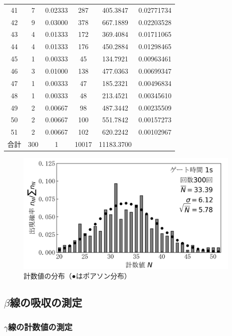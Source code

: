 \documentclass{jarticle}
\begin{document}
\begin{table}[H]
\begin{tabular}{cccccc}
    41 & 7 & 0.02333 & 287 & 405.3847 & 0.02771734 \\
    42 & 9 & 0.03000 & 378 & 667.1889 & 0.02203528 \\
    43 & 4 & 0.01333 & 172 & 369.4084 & 0.01711065 \\
    44 & 4 & 0.01333 & 176 & 450.2884 & 0.01298465 \\
    45 & 1 & 0.00333 & 45 & 134.7921 & 0.00963461 \\
    46 & 3 & 0.01000 & 138 & 477.0363 & 0.00699347 \\
    47 & 1 & 0.00333 & 47 & 185.2321 & 0.00496834 \\
    48 & 1 & 0.00333 & 48 & 213.4521 & 0.00345610 \\
    49 & 2 & 0.00667 & 98 & 487.3442 & 0.00235509 \\
    50 & 2 & 0.00667 & 100 & 551.7842 & 0.00157273 \\
    51 & 2 & 0.00667 & 102 & 620.2242 & 0.00102967 \\
    \hline
    合計 & 300 & 1 & 10017 & 11183.3700 & \\
    \end{tabular}
\end{table}

\begin{figure}[H]
  \begin{center}
    \includegraphics[width=110mm]{graph/count-distribution-30mm-300times.png}
    \caption{計数値の分布（●はポアソン分布）}
    \label{fg:count-distribution-30mm-300times}
  \end{center}
\end{figure}


\subsection{$\beta$線の吸収の測定}


\subsubsection{$\gamma$線の計数値の測定}
\end{document}
